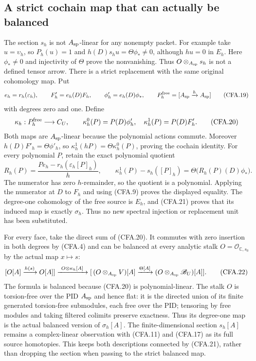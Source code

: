 \subsection{A strict cochain map that can actually be balanced}

The section $s_h$ is not $A_{\rm sp}$-linear for any nonempty packet.
For example take $u=\upsilon_h$, so $P_h(u)=1$ and
$h(D)s_hu=\Theta\phi_*\ne0$, although $hu=0$ in $E_h$.
Here $\phi_*\ne0$ and injectivity of $\Theta$ prove the nonvanishing.
Thus $O\otimes_{A_{\rm sp}}s_h$ is not a defined tensor arrow.
There is a strict replacement with the same original cohomology map.
Put
\[
 e_h=r_h(\varepsilon_h),\qquad
 F'_h=e_h(D)F_h,\qquad \phi'_h=e_h(D)\phi_*,\qquad
 P_h^{\rm free}=[A_{\rm sp}\xrightarrow{h}A_{\rm sp}]
                                                               \tag{CFA.19}
\]
with degrees zero and one.  Define
\[
 \kappa_h:P_h^{\rm free}\longrightarrow C_U,\qquad
 \kappa_h^0(P)=P(D)\phi'_h,\quad
 \kappa_h^1(P)=P(D)F'_h.                                     \tag{CFA.20}
\]
Both maps are $A_{\rm sp}$-linear because the polynomial actions
commute.  Moreover $h(D)F'_h=\Theta\phi'_h$, so
$\kappa_h^1(hP)=\Theta\kappa_h^0(P)$, proving the cochain identity.
For every polynomial $P$, retain the exact polynomial quotient
\[
 R_h(P)=\frac{P e_h-r_h(\varepsilon_h[P]_h)}{h},\qquad
 \kappa_h^1(P)-s_h([P]_h)=\Theta\bigl(R_h(P)(D)\phi_*\bigr).
                                                               \tag{CFA.21}
\]
The numerator has zero $h$-remainder, so the quotient is a polynomial.
Applying the numerator at $D$ to $F_h$ and using (CFA.9) proves
the displayed equality.  The degree-one cohomology of the free
source is $E_h$, and (CFA.21) proves that its induced map is exactly
$\sigma_h$.  Thus no new spectral injection or replacement unit
has been substituted.

For every face, take the direct sum of (CFA.20).  It commutes with
zero insertion in both degrees by (CFA.4) and can be balanced at
every analytic stalk $O=\mathcal O_{\mathbb C,s_0}$ by the actual
map $x\mapsto s$:
\[
 [O[A]\xrightarrow{h(s)}O[A]]
       \xrightarrow{\ O\otimes\kappa_h[A]\ }
 [\,(O\otimes_{A_{\rm sp}}V)[A]
               \xrightarrow{\Theta[A]}(O\otimes_{A_{\rm sp}}\mathscr B_U)[A]].
                                                               \tag{CFA.22}
\]
The formula is balanced because (CFA.20) is polynomial-linear.
The stalk $O$ is torsion-free over the PID $A_{\rm sp}$ and hence
flat: it is the directed union of its finite generated torsion-free
submodules, each free over the PID; tensoring by free modules and
taking filtered colimits preserve exactness.  Thus its degree-one
map is the actual balanced version of $\sigma_h[A]$.
The finite-dimensional section $s_h[A]$ remains a complex-linear
observation with (CFA.11) and (CFA.17) as its full source homotopies.
This keeps both descriptions connected by (CFA.21), rather than
dropping the section when passing to the strict balanced map.

